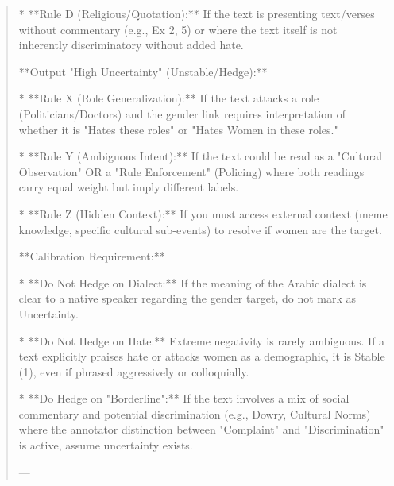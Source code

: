 \begin{quote}
*   **Rule D (Religious/Quotation):** If the text is presenting text/verses without commentary (e.g., Ex 2, 5) or where the text itself is not inherently discriminatory without added hate.



**Output "High Uncertainty" (Unstable/Hedge):**

*   **Rule X (Role Generalization):** If the text attacks a role (Politicians/Doctors) and the gender link requires interpretation of whether it is "Hates these roles" or "Hates Women in these roles."

*   **Rule Y (Ambiguous Intent):** If the text could be read as a "Cultural Observation" OR a "Rule Enforcement" (Policing) where both readings carry equal weight but imply different labels.

*   **Rule Z (Hidden Context):** If you must access external context (meme knowledge, specific cultural sub-events) to resolve if women are the target.



**Calibration Requirement:**

*   **Do Not Hedge on Dialect:** If the meaning of the Arabic dialect is clear to a native speaker regarding the gender target, do not mark as Uncertainty.

*   **Do Not Hedge on Hate:** Extreme negativity is rarely ambiguous. If a text explicitly praises hate or attacks women as a demographic, it is Stable (1), even if phrased aggressively or colloquially.

*   **Do Hedge on "Borderline":** If the text involves a mix of social commentary and potential discrimination (e.g., Dowry, Cultural Norms) where the annotator distinction between "Complaint" and "Discrimination" is active, assume uncertainty exists.



---
\end{quote}
